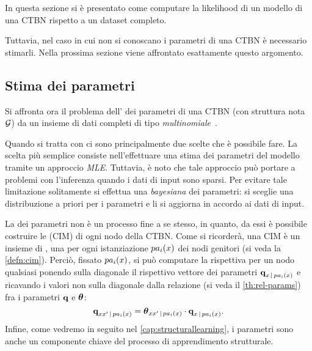 In questa sezione si è presentato come computare la likelihood di un modello di una \acs{CTBN} rispetto a un dataset completo.

Tuttavia, nel caso in cui non si conoscano i parametri di una \acs{CTBN} è necessario stimarli. Nella prossima sezione viene affrontato esattamente questo argomento.

\subsection{Stima dei parametri}\label{sec:ctbn-params}
Si affronta ora il problema dell' dei parametri di una \acl{CTBN} (con struttura nota $\mathcal{G}$) da un insieme di dati completi di tipo \emph{multinomiale}~\citep[si veda][sezione 5.1]{Nodelman2007}.

Quando si tratta con  ci sono principalmente due scelte che è possibile fare. La scelta più semplice consiste nell'effettuare una stima dei parametri del modello tramite un approccio \emph{\acl{MLE}}. Tuttavia, è noto che tale approccio può portare a problemi con l'inferenza quando i dati di input sono sparsi. Per evitare tale limitazione solitamente si effettua una \emph{ bayesiana} dei parametri: si sceglie una distribuzione a priori per i parametri e li si aggiorna in accordo ai dati di input.

La  dei parametri non è un processo fine a se stesso, in quanto,  da essi è possibile costruire le \cim{} (\acs{CIM}) di ogni nodo della \acs{CTBN}. Come si ricorderà, una \acs{CIM} è un insieme di \im{}, una per ogni istanziazione $pa_i(\mathnormal{x})$ dei nodi genitori (si veda la \autoref{defn:cim}). Perciò, fissato $pa_i(\mathnormal{x})$, si può computare la rispettiva \im*{} per un nodo qualsiasi ponendo sulla diagonale il rispettivo vettore dei parametri $\boldsymbol{\textbf{\text{q}}}_{\mathnormal{x}\,\arrowvert\,pa_i(\mathnormal{x})}$ e ricavando i valori non sulla diagonale dalla relazione (si veda il \autoref{th:rel-params}) fra i parametri $\boldsymbol{\textbf{\text{q}}}$ e $\boldsymbol{\textbf{\text{$\theta$}}}$:
\begin{equation}
\label{eq:ctbn-params-rel}
\boldsymbol{\textbf{\text{q}}}_{\mathnormal{x}\mathnormal{x}^\prime\,\arrowvert\,pa_i(\mathnormal{x})}=\boldsymbol{\textbf{\text{$\theta$}}}_{\mathnormal{x}\mathnormal{x}^\prime\,\arrowvert\,pa_i(\mathnormal{x})} \cdot \boldsymbol{\textbf{\text{q}}}_{\mathnormal{x}\,\arrowvert\,pa_i(\mathnormal{x})}\text{.}
\end{equation}
Infine, come vedremo in seguito nel \autoref{cap:structurallearning}, i parametri sono anche un componente chiave del processo di apprendimento strutturale.

